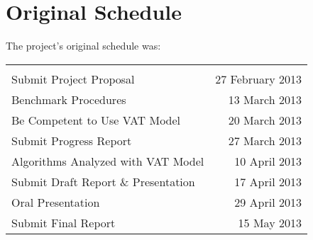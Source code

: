 \section{Original Schedule}
  The project's original schedule was:
  
  \begin{tabular}{lr}
  &\\
    Submit Project Proposal             & 27 February 2013\\
    Benchmark Procedures                & 13 March 2013   \\
    Be Competent to Use VAT Model       & 20 March 2013   \\
    Submit Progress Report              & 27 March 2013   \\
    Algorithms Analyzed with VAT Model  & 10 April 2013   \\
    Submit Draft Report \& Presentation & 17 April 2013   \\
    Oral Presentation                   & 29 April 2013   \\
    Submit Final Report                 & 15 May 2013     \\
  \end{tabular}
  
